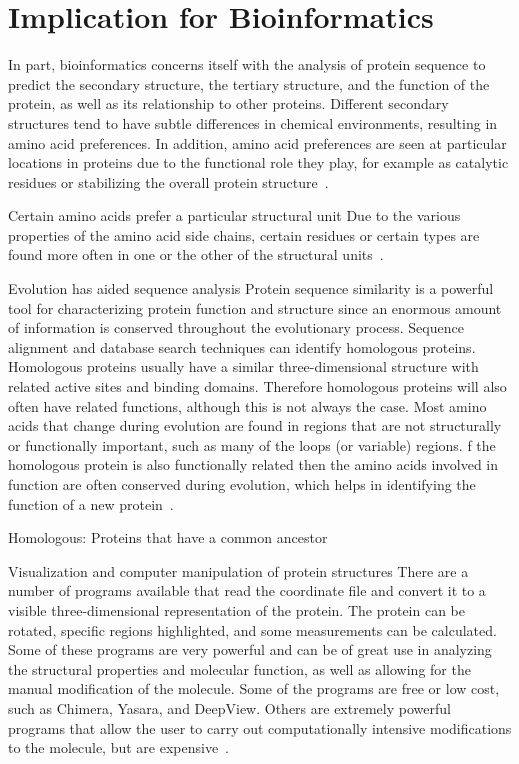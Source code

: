 \documentclass{report}
\begin{document}
\section{Implication for Bioinformatics}

In part, bioinformatics concerns itself with the analysis of protein sequence to predict the secondary structure, the tertiary structure, and the function of the protein, as well as its relationship to other proteins. Different secondary structures tend to have subtle differences in chemical environments, resulting in amino acid preferences. In addition, amino acid preferences are seen at particular locations in proteins due to the functional role they play, for example as catalytic residues or stabilizing the overall protein structure~\cite{zvelebil_understanding_2008}.

Certain amino acids prefer a particular structural unit
Due to the various properties of the amino acid side chains, certain residues or certain types are found more often in one or the other of the structural units~\cite{zvelebil_understanding_2008}.

Evolution has aided sequence analysis
Protein sequence similarity is a powerful tool for characterizing protein function and structure since an enormous amount of information is conserved throughout the evolutionary process. Sequence alignment and database search techniques can identify homologous proteins. Homologous proteins usually have a similar three-dimensional structure with related active sites and binding domains. Therefore homologous proteins will also often have related functions, although this is not always the case. Most amino acids that change during evolution are found in regions that are not structurally or functionally important, such as many of the loops (or variable) regions. f the homologous protein is also functionally related then the amino acids involved in function are often conserved during evolution, which helps in identifying the function of a new protein~\cite{zvelebil_understanding_2008}.

Homologous: Proteins that have a common ancestor

Visualization and computer manipulation of protein structures
There are a number of programs available that read the coordinate file and convert it to a visible three-dimensional representation of the protein. The protein can be rotated, specific regions highlighted, and some measurements can be calculated. Some of these programs are very powerful and can be of great use in analyzing the structural properties and molecular function, as well as allowing for the manual modification of the molecule. Some of the programs are free or low cost, such as Chimera, Yasara, and DeepView. Others are extremely powerful programs that allow the user to carry out computationally intensive modifications to the molecule, but are expensive~\cite{zvelebil_understanding_2008}.




\end{document}
